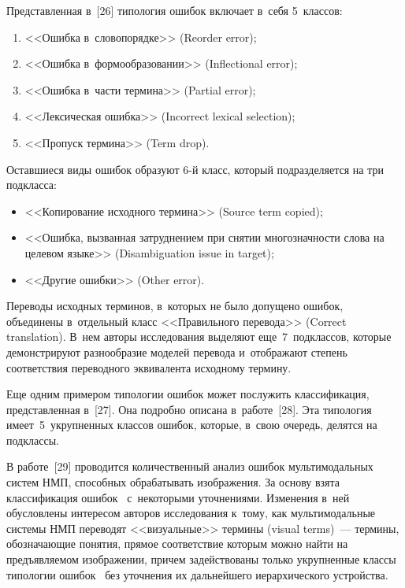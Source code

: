 \begin{multicols}{2}
  Представленная в~[26] типология ошибок включает в~себя 5~классов: 
\begin{enumerate}[(1)]
\item <<Ошибка в~словопорядке>> (Reorder error);\\[-10pt] 
\item <<Ошибка 
в~формообразовании>> (Inflectional error);\\[-10pt] 
\item <<Ошибка в~части термина>> 
(Partial error); \\[-10pt]
\item <<Лексическая ошибка>> (Incorrect lexical selection); \\[-10pt]
\item <<Пропуск термина>> (Term drop).
\end{enumerate}
 Оставшиеся виды ошибок образуют 
6-й класс, который подразделяется на три подкласса: 
\begin{itemize}
\item <<Копирование 
исходного термина>> (Source term copied); \\[-10pt]
\item <<Ошибка, вызванная 
затруднением при снятии многозначности слова на целевом языке>> 
(Disambiguation issue in target); 
\item <<Другие ошибки>> (Other error).
\end{itemize}

 Переводы 
исходных терминов, в~которых не было допущено ошибок, объединены 
в~отдельный класс <<Правильного перевода>> (Correct translation). В~нем 
авторы исследования выделяют еще~7~подклассов, которые 
демонстрируют разнообразие моделей перевода и~отображают степень 
соответствия переводного эквивалента исходному термину.
  
  Еще одним примером типологии ошибок может послужить 
классификация, представленная в~[27]. Она подробно описана в~работе~[28]. 
Эта типология имеет~5~укрупненных классов ошибок, которые, в~свою 
очередь, делятся на подклассы.
  
  В работе~[29] проводится количественный анализ ошибок 
мультимодальных систем НМП, способных обрабатывать изображения. За 
основу взята классификация ошибок~\cite{27-nur} с~некоторыми 
уточнениями. Изменения в~ней обусловлены интересом авторов 
исследования к~тому, как мультимодальные системы НМП переводят 
<<визуальные>> термины (visual terms)~--- термины, обозначающие понятия, 
прямое соответствие которым можно найти на предъявляемом изображении, 
причем задействованы только укрупненные классы типологии 
ошибок~\cite{27-nur} без уточнения их дальнейшего иерархического 
устройства.
  

\end{multicols}
